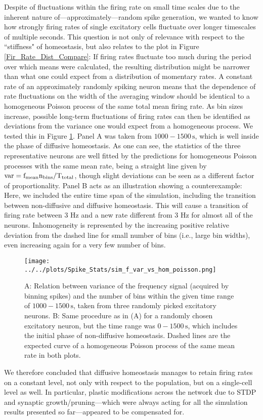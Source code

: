 \documentclass[10pt,a4paper]{article}
\begin{document}
Despite of fluctuations within the firing rate on small time scales due to the inherent nature of---approximately---random spike generation, we wanted to know how strongly firing rates of single excitatory cells fluctuate over longer timescales of multiple seconds. This question is not only of relevance with respect to the ``stiffness" of homeostasis, but also relates to the plot in Figure \ref{Fir_Rate_Dist_Compare}: If firing rates fluctuate too much during the period over which means were calculated, the resulting distribution might be narrower than what one could expect from a distribution of momentary rates. A constant rate of an approximately randomly spiking neuron means that the dependence of rate fluctuations on the width of the averaging window should be identical to a homogeneous Poisson process of the same total mean firing rate. As bin sizes increase, possible long-term fluctuations of firing rates can then be identified as deviations from the variance one would expect from a homogeneous process. We tested this in Figure \ref{f_Var_vs_n_Bin}. Panel A was taken from $\mathrm{1000-1500\,s}$, which is well inside the phase of diffusive homeostasis. As one can see, the statistics of the three representative neurons are well fitted by the predictions for homogeneous Poisson processes with the same mean rate, being a straight line given by $\mathrm{var = f_{\rm mean} n_{\rm bins}/T_{\rm total}}$, though slight deviations can be seen as a different factor of proportionality. Panel B acts as an illustration showing a counterexample: Here, we included the entire time span of the simulation, including the transition between non-diffusive and diffusive homeostasis. This will cause a transition of firing rate between 3 Hz and a new rate different from 3 Hz for almost all of the neurons. Inhomogeneity is represented by the increasing positive relative deviation from the dashed line for small number of bins (i.e., large bin widths), even increasing again for a very few number of bins.
\begin{figure}
\texttt{[image: ../../plots/Spike\_Stats/sim\_f\_var\_vs\_hom\_poisson.png]}
\caption[Relation between variance of the frequency signal and the number of bins]{A: Relation between variance of the frequency signal (acquired by binning spikes) and the number of bins within the given time range of $\mathrm{1000-1500\,s}$, taken from three randomly picked excitatory neurons. B: Same procedure as in (A) for a randomly chosen excitatory neuron, but the time range was $\mathrm{0-1500\,s}$, which includes the initial phase of non-diffusive homeostasis. Dashed lines are the expected curve of a homogeneous Poisson process of the same mean rate in both plots.}
\label{f_Var_vs_n_Bin}
\end{figure}
We therefore concluded that diffusive homeostasis manages to retain firing rates on a constant level, not only with respect to the population, but on a single-cell level as well. In particular, plastic modifications across the network due to STDP and synaptic growth/pruning---which were always acting for all the simulation results presented so far---appeared to be compensated for.
\end{document}
